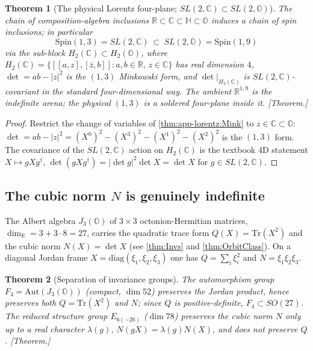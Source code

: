 \documentclass[11pt]{article}
\theoremstyle{plain}
\newtheorem{theorem}{Theorem}[section]
\theoremstyle{definition}
\theoremstyle{remark}
\begin{document}
\begin{theorem}[The physical Lorentz four-plane; \texorpdfstring{$SL(2,\mathbb{C})\subset SL(2,\mathbb{O})$}{SL(2,C) in SL(2,O)}]
\label{thm:app-lorentz:SL2C}
The chain of composition-algebra inclusions
$\mathbb{R}\subset\mathbb{C}\subset\mathbb{H}\subset\mathbb{O}$ induces a chain of
spin inclusions; in particular
\begin{equation}
\label{eq:app-lorentz:c-in-o}
\mathrm{Spin}(1,3)=SL(2,\mathbb{C})\ \subset\ SL(2,\mathbb{O})=\mathrm{Spin}(1,9)
\end{equation}
via the sub-block $H_{2}(\mathbb{C})\subset H_{2}(\mathbb{O})$, where
$H_{2}(\mathbb{C})=\{[[a,z],[\bar{z},b]]:a,b\in\mathbb{R},\,z\in\mathbb{C}\}$ has
real dimension $4$, $\det=ab-|z|^{2}$ is the $(1,3)$ Minkowski form, and
$\det|_{H_{2}(\mathbb{C})}$ is $SL(2,\mathbb{C})$-covariant in the standard
four-dimensional way. The ambient $\mathbb{R}^{1,9}$ is the indefinite arena; the
\emph{physical} $(1,3)$ is a soldered four-plane inside it. \emph{[Theorem.]}
\end{theorem}

\begin{proof}
Restrict the change of variables of \autoref{thm:app-lorentz:Mink} to
$z\in\mathbb{C}\subset\mathbb{O}$: $\det=ab-|z|^{2}=(X^{0})^{2}-(X^{3})^{2}-(X^{1})^{2}-(X^{2})^{2}$
is the $(1,3)$ form. The covariance of the $SL(2,\mathbb{C})$ action on
$H_{2}(\mathbb{C})$ is the textbook 4D statement $X\mapsto gXg^{\dagger}$,
$\det(gXg^{\dagger})=|\det g|^{2}\det X=\det X$ for $g\in SL(2,\mathbb{C})$.
\end{proof}

\subsection{The cubic norm \texorpdfstring{$N$}{N} is genuinely indefinite}
\label{subsec:app-lorentz:cubic}

The Albert algebra $J_{3}(\mathbb{O})$ of $3\times3$ octonion-Hermitian matrices,
$\dim_{\mathbb{R}}=3+3\cdot8=27$, carries the quadratic trace form
$Q(X)=\mathrm{Tr}(X^{2})$ and the cubic norm $N(X)=\det X$
(see \autoref{thm:Invs} and \autoref{thm:OrbitClass}). On a diagonal Jordan frame
$X=\mathrm{diag}(\xi_{1},\xi_{2},\xi_{3})$ one has $Q=\sum_{i}\xi_{i}^{2}$ and
$N=\xi_{1}\xi_{2}\xi_{3}$.

\begin{theorem}[Separation of invariance groups]
\label{thm:app-lorentz:groups}
The automorphism group $F_{4}=\mathrm{Aut}(J_{3}(\mathbb{O}))$ (compact, $\dim 52$)
preserves the Jordan product, hence preserves \emph{both} $Q=\mathrm{Tr}(X^{2})$ and
$N$; since $Q$ is positive-definite, $F_{4}\subset SO(27)$. The reduced structure
group $E_{6(-26)}$ ($\dim 78$) preserves the cubic norm $N$ \emph{only up to a real
character} $\lambda(g)$, $N(gX)=\lambda(g)N(X)$, and does \emph{not} preserve $Q$.
\emph{[Theorem.]}
\end{theorem}
\end{document}

